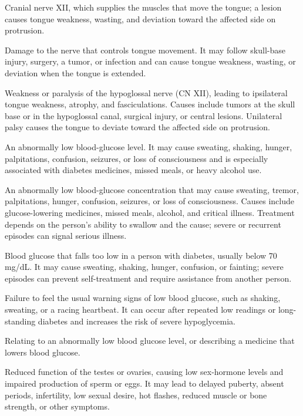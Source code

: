  Cranial nerve XII, which supplies the muscles that move the tongue; a lesion causes tongue weakness, wasting, and deviation toward the affected side on protrusion.

 Damage to the nerve that controls tongue movement. It may follow skull-base injury, surgery, a tumor, or infection and can cause tongue weakness, wasting, or deviation when the tongue is extended.

 Weakness or paralysis of the hypoglossal nerve (CN XII), leading to ipsilateral tongue
weakness, atrophy, and fasciculations. Causes include tumors at the skull base or in the
hypoglossal canal, surgical injury, or central lesions. Unilateral palsy causes the
tongue to deviate toward the affected side on protrusion.

 An abnormally low blood-glucose level. It may cause sweating, shaking, hunger, palpitations, confusion, seizures, or loss of consciousness and is especially associated with diabetes medicines, missed meals, or heavy alcohol use.

 An abnormally low blood-glucose concentration that may cause sweating, tremor, palpitations, hunger,
confusion, seizures, or loss of consciousness. Causes include glucose-lowering medicines,
missed meals, alcohol, and critical illness. Treatment depends on the person’s ability to
swallow and the cause; severe or recurrent episodes can signal serious illness.

 Blood glucose that falls too low in a person with diabetes, usually below 70 mg/dL. It may cause sweating, shaking, hunger, confusion, or fainting; severe episodes can prevent self-treatment and require assistance from another person.

 Failure to feel the usual warning signs of low blood glucose, such as shaking, sweating, or a racing heartbeat. It can occur after repeated low readings or long-standing diabetes and increases the risk of severe hypoglycemia.

 Relating to an abnormally low blood glucose level, or describing a medicine that lowers blood glucose.

 Reduced function of the testes or ovaries, causing low sex-hormone levels and impaired production of sperm or eggs. It may lead to delayed puberty, absent periods, infertility, low sexual desire, hot flashes, reduced muscle or bone strength, or other symptoms.

